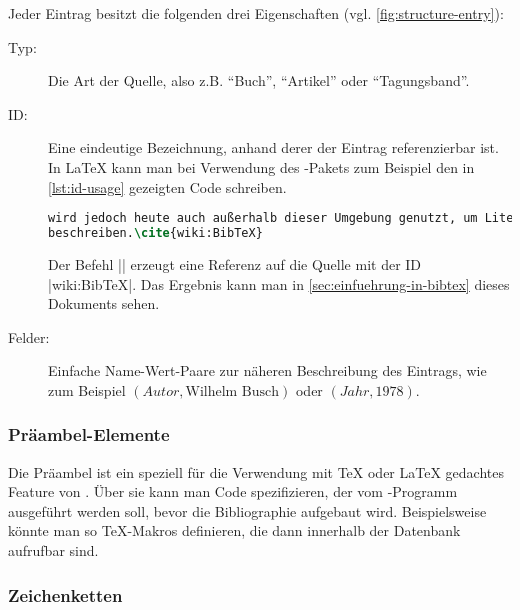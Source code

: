 Jeder Eintrag besitzt die folgenden drei Eigenschaften (vgl.
\autoref{fig:structure-entry}):

\begin{description}
    \item[Typ:] Die Art der Quelle, also z.B. \enquote{Buch}, \enquote{Artikel}
        oder \enquote{Tagungsband}.
    \item[ID:] Eine eindeutige Bezeichnung, anhand derer der Eintrag
        referenzierbar ist. In \LaTeX{} kann man bei Verwendung des
        \mbox{-}Pakets zum Beispiel den in \autoref{lst:id-usage}
        gezeigten Code schreiben.
\begin{lstlisting}[language=TeX,label=lst:id-usage,caption=Beispiel für die Nutzung einer Eintrags-ID]
% [...]
wird jedoch heute auch außerhalb dieser Umgebung genutzt, um Literaturquellen zu
beschreiben.\cite{wiki:BibTeX}
\end{lstlisting}
        \raggedright{
            Der Befehl \lstinlineTeX|\cite{wiki:BibTeX}| erzeugt eine Referenz
            auf die Quelle mit der ID \mbox{\lstinlineplain|wiki:BibTeX|}. Das
            Ergebnis kann man in \autoref{sec:einfuehrung-in-bibtex} dieses
            Dokuments sehen.
        }
    \item[Felder:] Einfache Name-Wert-Paare zur näheren Beschreibung des
        Eintrags, wie zum Beispiel $(Autor,\text{Wilhelm Busch})$ oder
        $(Jahr,1978)$.
\end{description}

\subsubsection{Präambel-Elemente}

Die Präambel ist ein speziell für die Verwendung mit \TeX{} oder \LaTeX{}
gedachtes Feature von \BibTeX{}. Über sie kann man Code spezifizieren, der
vom \mbox{\BibTeX-}Programm ausgeführt werden soll, bevor die Bibliographie
aufgebaut wird. Beispielsweise könnte man so \mbox{\TeX-}Makros definieren, die
dann innerhalb der Datenbank aufrufbar sind.

\subsubsection{Zeichenketten}

\def\temp{\enquote{Wikipedia, Die freie Enzyklopädie}}

